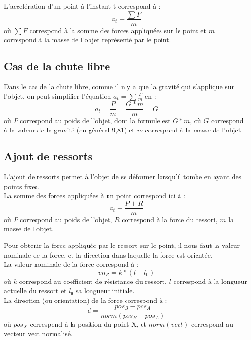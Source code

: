\documentclass[a4paper]{article}
\begin{document}
L'accelération d'un point à l'instant t correspond à :
\begin{equation}
  a_t = \frac{\sum F}{m}
\end{equation}
où $\sum F$ correspond à la somme des forces appliquées sur le point et $m$ correspond à la masse de l'objet représenté par le point.

\subsection{Cas de la chute libre}

Dans le cas de la chute libre, comme il n'y a que la gravité qui s'applique sur l'objet, on peut simplifier l'équation $a_t = \sum \frac{F}{m}$ en :
\begin{equation}
  a_t = \frac{P}{m} = \frac{G * m}{m} = G
\end{equation}
où $P$ correspond au poids de l'objet, dont la formule est $G * m$, où $G$ correspond à la valeur de la gravité (en général 9,81) et $m$ correspond à la masse de l'objet.

\subsection{Ajout de ressorts}

L'ajout de ressorts permet à l'objet de se déformer lorsqu'il tombe en ayant des points fixes.\\

La somme des forces appliquées à un point correspond ici à :
\begin{equation}
  a_t = \frac{P + R}{m}
\end{equation}
où $P$ correspond au poids de l'objet, $R$ correspond à la force du ressort, $m$ la masse de l'objet.

Pour obtenir la force appliquée par le ressort sur le point, il nous faut la valeur nominale de la force, et la direction dans laquelle la force est orientée.\\

La valeur nominale de la force correspond à :
\begin{equation}
  vn_R = k * (l - l_0)
\end{equation}
où $k$ correspond au coefficient de résistance du ressort, $l$ correspond à la longueur actuelle du ressort et $l_0$ sa longueur initiale.\\

La direction (ou orientation) de la force correspond à :
\begin{equation}
  d = \frac{pos_B - pos_A}{norm(pos_B - pos_A)}
\end{equation}
où $pos_X$ correspond à la position du point X, et $norm(vect)$ correspond au vecteur vect normalisé.\\
\end{document}
